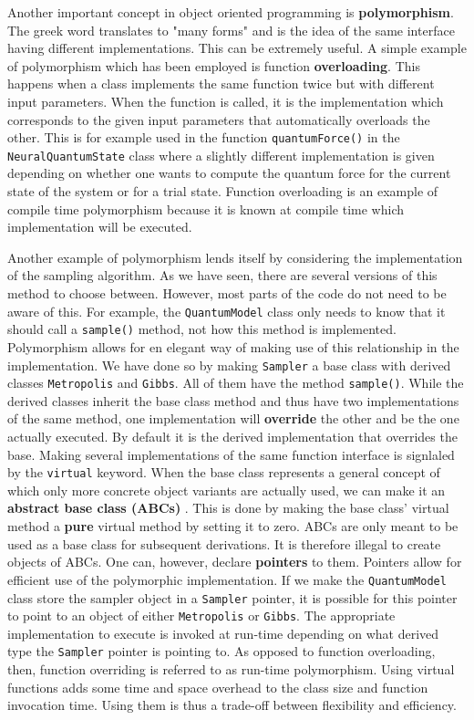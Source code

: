 \documentclass[twoside,english]{uiofysmaster}
\begin{document}
Another important concept in object oriented programming is \textbf{polymorphism}. The greek word translates to "many forms" and is the idea of the same interface having different implementations. This can be extremely useful. 
A simple example of polymorphism which has been employed is function \textbf{overloading}. This happens when a class implements the same function twice but with different input parameters. When the function is called, it is the implementation which corresponds to the given input parameters that automatically overloads the other. This is for example used in the function \texttt{quantumForce()} in the \texttt{NeuralQuantumState} class where a slightly different implementation is given depending on whether one wants to compute the quantum force for the current state of the system or for a trial state. Function overloading is an example of compile time polymorphism because it is known at compile time which implementation will be executed.

Another example of polymorphism lends itself by considering the implementation of the sampling algorithm. As we have seen, there are several versions of this method to choose between. However, most parts of the code do not need to be aware of this. For example, the \texttt{QuantumModel} class only needs to know that it should call a \texttt{sample()} method, not how this method is implemented. Polymorphism allows for en elegant way of making use of this relationship in the implementation. We have done so by making \texttt{Sampler} a base class with derived classes \texttt{Metropolis} and \texttt{Gibbs}. All of them have the method \texttt{sample()}. While the derived classes inherit the base class method and thus have two implementations of the same method, one implementation will \textbf{override} the other and be the one actually executed. By default it is the derived implementation that overrides the base. Making several implementations of the same function interface is signlaled by the \texttt{virtual} keyword. 
When the base class represents a general concept of which only more concrete object variants are actually used, we can make it an \textbf{abstract base class (ABCs)} \cite{Lippman2013}. This is done by making the base class' virtual method a \textbf{pure} virtual method by setting it to zero. ABCs are only meant to be used as a base class for subsequent derivations. It is therefore illegal to create objects of ABCs. One can, however, declare \textbf{pointers} to them.
Pointers allow for efficient use of the polymorphic implementation. If we make the \texttt{QuantumModel} class store the sampler object in a \texttt{Sampler} pointer, it is possible for this pointer to point to an object of either \texttt{Metropolis} or \texttt{Gibbs}. The appropriate implementation to execute is invoked at run-time depending on what derived type the \texttt{Sampler} pointer is pointing to. As opposed to function overloading, then, function overriding is referred to as run-time polymorphism. Using virtual functions adds some time and space overhead to the class size and function invocation time. Using them is thus a trade-off between flexibility and efficiency. 
\end{document}
